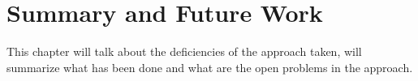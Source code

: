 \chapter{Summary and Future Work}

This chapter will talk about the deficiencies of the approach taken, will summarize what has been done and what are the open problems in the approach.